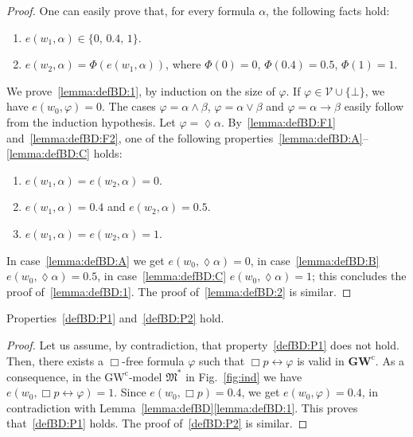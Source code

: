 \documentclass[copyright,creativecommons]{eptcs}
\newcommand{\GWCL}{\mathbf{GW}^\mathrm{c}}
\newcommand{\GWCM}{\mbox{$\mathrm{GW}^\mathrm{c}$}}
\newcommand{\tto}{\leftrightarrow}
\newcommand{\Diam}{\lozenge}
\newcommand{\PV}{\Vcal}
\newcommand{\M}{\mathfrak{M}}
\renewcommand{\a}{\alpha}
\renewcommand{\b}{\beta}
\newcommand{\Vcal}{\mathcal{V}}
\begin{document}
\begin{proof}
  One can easily prove that, for every formula $\a$, the following
  facts hold:
  
  \begin{enumerate}[label=(\arabic*), ref=(\arabic*),leftmargin=*]    
  \item\label{lemma:defBD:F1}
    $e(w_1,\a)\in\{0,\,0.4,\,1\}$.
    
  \item\label{lemma:defBD:F2}
    $e(w_2,\a)=\Phi(e(w_1,\a))$,
    where $\Phi(0)=0$,  $\Phi(0.4)=0.5$, $\Phi(1)=1$.
  \end{enumerate}
  We prove~\ref{lemma:defBD:1}, by induction on the size of
  $\varphi$.  If $\varphi\in\PV\cup\{\bot\}$, we have $e(w_0,\varphi)
  = 0$.  The cases $\varphi=\a\land \b$, $\varphi=\a\lor \b$ and
  $\varphi=\a\to \b$ easily follow from the induction hypothesis.  Let
  $\varphi = \Diam \a$.  By~\ref{lemma:defBD:F1}
  and~\ref{lemma:defBD:F2}, one of the following
  properties~\ref{lemma:defBD:A}--\ref{lemma:defBD:C} holds:

  
  \begin{enumerate}[label=(\alph*), ref=(\alph*),leftmargin=*]    
  \item\label{lemma:defBD:A} $e(w_1,\a) = e(w_2,\a) = 0$.
    
  \item\label{lemma:defBD:B} $e(w_1,\a) = 0.4$ and $e(w_2,\a) = 0.5$.

  \item\label{lemma:defBD:C} $e(w_1,\a) = e(w_2,\a) = 1$.
  \end{enumerate}
  In case~\ref{lemma:defBD:A} we get $e(w_0,\Diam \a)=0$, in
  case~\ref{lemma:defBD:B} $e(w_0,\Diam \a)=0.5$, in
  case~\ref{lemma:defBD:C} $e(w_0,\Diam \a)=1$; this concludes the
  proof of~\ref{lemma:defBD:1}.  The proof of~\ref{lemma:defBD:2} is
  similar.
\end{proof}



\begin{proposition}\label{prop:gwclBD}
  Properties~\ref{defBD:P1} and~\ref{defBD:P2} hold.
\end{proposition}  

\begin{proof}
  Let us assume, by contradiction, that property~\ref{defBD:P1} does
  not hold.  Then, there exists a $\Box$-free formula $\varphi$ such
  that $\Box p \tto\varphi$ is valid in $\GWCL$. As a consequence, in
  the \GWCM-model $\M^\ast$ in Fig.~\ref{fig:ind} we have $e(w_0, \Box
  p \tto\varphi)=1$. Since $e(w_0, \Box p)= 0.4$, we get $e(w_0,
  \varphi)= 0.4$, in contradiction with
  Lemma~\ref{lemma:defBD}\ref{lemma:defBD:1}.  This proves
  that~\ref{defBD:P1} holds. The proof of~\ref{defBD:P2} is similar.
\end{proof}
\end{document}
